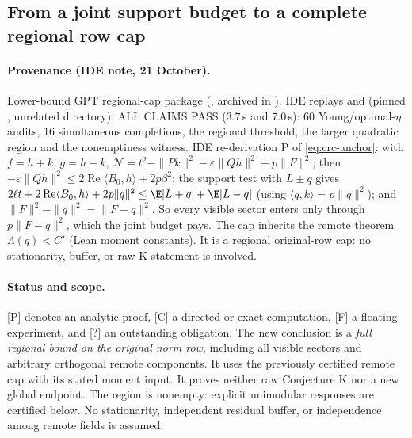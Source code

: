 \subsection{From a joint support budget to a complete regional row cap}
\label{sec:canonical-response-cap}
\paragraph{Provenance (IDE note, 21 October).} Lower-bound GPT regional-cap package (, archived in
). IDE replays  and  (pinned , unrelated directory):
ALL CLAIMS PASS (3.7\,s and 7.0\,s): 60 Young/optimal-$\eta$ audits, 16 simultaneous completions, the regional threshold, the larger quadratic region and the nonemptiness
witness. IDE re-derivation \st{P} of \eqref{eq:crc-anchor}: with $f=h+k$, $g=h-k$, $\mathcal N=t^2-\|Pk\|^2-\varepsilon\|Qh\|^2+p\|F\|^2$; then
$-\varepsilon\|Qh\|^2\le2\operatorname{Re}\langle B_0,h\rangle+2p\beta^2$; the support test with $L\pm q$ gives $2\ell t+2\operatorname{Re}\langle B_0,h\rangle+2p\|q\|^2\le\E|L+q|+\E|L-q|$
(using $\langle q,k\rangle=p\|q\|^2$); and $\|F\|^2-\|q\|^2=\|F-q\|^2$. So every visible sector enters only through $p\|F-q\|^2$, which the joint budget pays. The
cap inherits the remote theorem $\Lambda(q)<C'$ (Lean moment constants). It is a regional original-row cap: no stationarity, buffer, or raw-K statement is involved.


\paragraph{Status and scope.}
[P] denotes an analytic proof, [C] a directed or exact computation,
[F] a floating experiment, and [?] an outstanding obligation.
The new conclusion is a \emph{full regional bound on the original norm
row}, including all visible sectors and arbitrary orthogonal remote
components. It uses the previously certified remote cap with its stated
moment input. It proves neither raw Conjecture K nor a new global endpoint.
The region is nonempty: explicit unimodular responses are certified below.
No stationarity, independent residual buffer, or independence among
remote fields is assumed.

